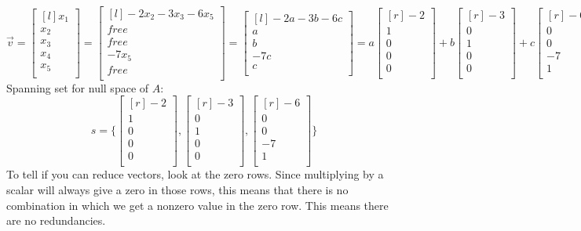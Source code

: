 \documentclass{report}
\begin{document}
\[ \vec{v} = \begin{bmatrix}[l] x_1\\x_2\\x_3\\x_4\\x_5\\ \end{bmatrix} = \begin{bmatrix}[l] -2x_2-3x_3-6x_5\\ free\\ free\\ -7x_5\\ free\\ \end{bmatrix} = \begin{bmatrix}[l] -2a-3b-6c\\a\\b\\-7c\\c\\ \end{bmatrix} = a\begin{bmatrix}[r]-2\\1\\0\\0\\0\\ \end{bmatrix}+b\begin{bmatrix}[r]-3\\0\\1\\0\\0\\ \end{bmatrix} + c\begin{bmatrix}[r]-6\\0\\0\\-7\\1\\ \end{bmatrix}\]
Spanning set for null space of $A$:
\[ s= \{\begin{bmatrix}[r]-2\\1\\0\\0\\0\\ \end{bmatrix}, \begin{bmatrix}[r]-3\\0\\1\\0\\0\\ \end{bmatrix},\begin{bmatrix}[r]-6\\0\\0\\-7\\1\\ \end{bmatrix} \} \]
To tell if you can reduce vectors, look at the zero rows. Since multiplying by a scalar will always give a zero in those rows, this means that there is no combination in which we get a nonzero value in the zero row. This means there are no redundancies. 
\end{document}
